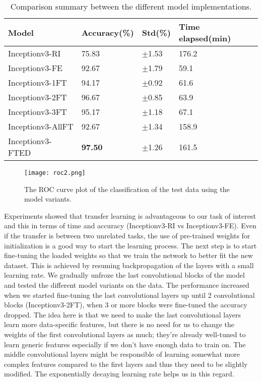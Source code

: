\documentclass{article}
\begin{document}
\begin{table}[h]
  \caption{Comparison summary between the different model implementations.}
  \label{res}
  \centering
  \begin{tabular}{llll}
    \toprule
    Model    & Accuracy(\%)   & Std(\%)  &Time elapsed(min) \\
    \midrule
    Inceptionv3-RI   	& 75.83 	& $\pm$1.53    &176.2 		\\
    Inceptionv3-FE   	& 92.67 	& $\pm$1.79    &59.1		\\
    Inceptionv3-1FT  	& 94.17 	& $\pm$0.92    &61.6		\\
    Inceptionv3-2FT  	& 96.67 	& $\pm$0.85    &63.9		\\
    Inceptionv3-3FT  	& 95.17 	& $\pm$1.18    &67.1		\\
    Inceptionv3-AllFT   & 92.67	& $\pm$1.34    &158.9		\\
    Inceptionv3-FTED    & \textbf{97.50}	& $\pm$1.26   &161.5		\\
    \bottomrule
  \end{tabular}
\end{table}

\begin{figure}
  \centering
  \texttt{[image: roc2.png]}
  \caption{The ROC curve plot of the classification of the test data using the model variants.}
  \label{fig:roc}
\end{figure}
Experiments showed that transfer learning is advantageous to our task of interest and this in terms of time and accuracy (Inceptionv3-RI vs Inceptionv3-FE). Even if the transfer is between two unrelated tasks, the use of pre-trained weights for initialization is a good way to start the learning process. The next step is to start fine-tuning the loaded weights so that we train the network to better fit the new dataset. This is achieved by resuming backpropagation of the layers with a small learning rate. We gradually unfroze the last convolutional blocks of the model and tested the different model variants on the data. The performance increased when we started fine-tuning the last convolutional layers up until 2 convolutional blocks (Inceptionv3-2FT), when 3 or more blocks were fine-tuned the accuracy dropped. The idea here is that we need to make the last convolutional layers learn more data-specific features, but there is no need for us to change the weights of the first convolutional layers as much; they're already well-tuned to learn generic features especially if we don't have enough data to train on. The middle convolutional layers might be responsible of learning somewhat more complex features compared to the first layers and thus they need to be slightly modified. The exponentially decaying learning rate helps us in this regard.
\end{document}
